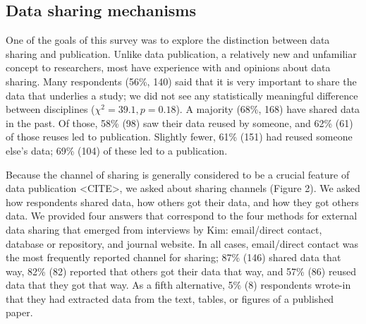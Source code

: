 \documentclass[10pt]{article}
\begin{document}
\subsection*{Data sharing mechanisms}
One of the goals of this survey was to explore the distinction between data sharing and publication.
Unlike data publication, a relatively new and unfamiliar concept to researchers, most have experience with and opinions about data sharing.
Many respondents (56\%, 140) said that it is very important to share the data that underlies a study; we did not see any statistically meaningful difference between disciplines ($\chi^{2}= 39.1, p= 0.18$). %
A majority (68\%, 168) have shared data in the past.
Of those, 58\% (98) saw their data reused by someone, and 62\% (61) of those reuses led to publication.
Slightly fewer, 61\% (151) had reused someone else's data; 69\% (104) of these led to a publication.

Because the channel of sharing is generally considered to be a crucial feature of data publication <CITE>, we asked about sharing channels (Figure 2).
We asked how respondents shared data, how others got their data, and how they got others data.
We provided four answers that correspond to the four methods for external data sharing that emerged from interviews by Kim\cite{kim_institutional_2012}: email/direct contact, database or repository, and journal website.
In all cases, email/direct contact was the most frequently reported channel for sharing; 87\% (146) shared data that way, 82\% (82) reported that others got their data that way, and 57\% (86) reused data that they got that way.
As a fifth alternative, 5\% (8) respondents wrote-in that they had extracted data from the text, tables, or figures of a published paper.
\end{document}
